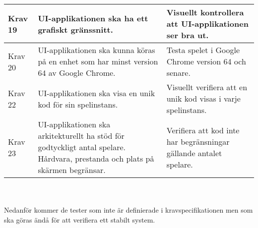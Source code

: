 \begin{tabular}{| p{1.5cm} | p{6cm} | p{8cm}|}
		\hline
		Krav 19& UI-applikationen ska ha ett grafiskt gränssnitt. &Visuellt kontrollera att UI-applikationen ser bra ut.\\
		\hline
		Krav 20& UI-applikationen ska kunna köras på en enhet som har minst version 64 av Google Chrome. &Testa spelet i Google Chrome version 64 och senare. \\
		\hline
		Krav 22& UI-applikationen ska visa en unik kod för sin spelinstans. &Visuellt verifiera att en unik kod visas i varje spelinstans.\\
		\hline
		Krav 23& UI-applikationen ska arkitekturellt ha stöd för godtyckligt antal spelare. Hårdvara, prestanda och plats på skärmen begränsar. &Verifiera att kod inte har begränsningar gällande antalet spelare. \\
		\hline



  \end{tabular}
	\\ \\
	Nedanför kommer de tester som inte är definierade i kravspecifikationen \cite{bib-kravspec} men som ska göras ändå för att verifiera ett stabilt system.

